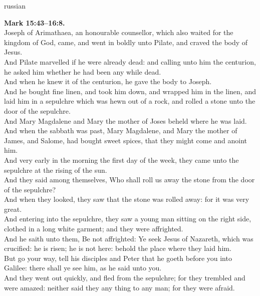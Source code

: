 \documentclass[10pt]{article} %
\begin{document}
{\begin{minipage}[t]{0.45\textwidth}
\begin{otherlanguage*}{russian}
\end{otherlanguage*}
\end{minipage}
\hfill
\begin{minipage}[t]{0.45\textwidth}

\textbf{Mark 15:43--16:8.}\\
Joseph of Arimathaea, an honourable counsellor, which also waited for the kingdom of God, came, and went in boldly unto Pilate, and craved the body of Jesus.\\
And Pilate marvelled if he were already dead: and calling unto him the centurion, he asked him whether he had been any while dead.\\
And when he knew it of the centurion, he gave the body to Joseph.\\
And he bought fine linen, and took him down, and wrapped him in the linen, and laid him in a sepulchre which was hewn out of a rock, and rolled a stone unto the door of the sepulchre.\\
And Mary Magdalene and Mary the mother of Joses beheld where he was laid.\\
And when the sabbath was past, Mary Magdalene, and Mary the mother of James, and Salome, had bought sweet spices, that they might come and anoint him.\\
And very early in the morning the first day of the week, they came unto the sepulchre at the rising of the sun.\\
And they said among themselves, Who shall roll us away the stone from the door of the sepulchre?\\
And when they looked, they saw that the stone was rolled away: for it was very great.\\
And entering into the sepulchre, they saw a young man sitting on the right side, clothed in a long white garment; and they were affrighted.\\
And he saith unto them, Be not affrighted: Ye seek Jesus of Nazareth, which was crucified: he is risen; he is not here: behold the place where they laid him.\\
But go your way, tell his disciples and Peter that he goeth before you into Galilee: there shall ye see him, as he said unto you.\\
And they went out quickly, and fled from the sepulchre; for they trembled and were amazed: neither said they any thing to any man; for they were afraid.\\

\end{minipage}}
\vspace*{\fill}
\end{document}
